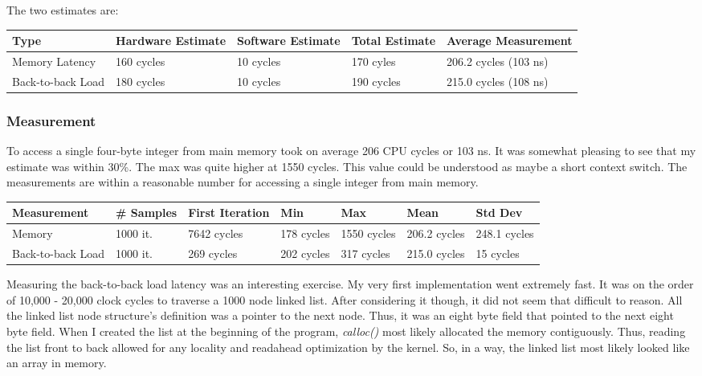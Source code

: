 \documentclass[paper=a4, fontsize=11pt]{scrartcl}
\numberwithin{equation}{section}        %
\numberwithin{figure}{section}          %
\numberwithin{table}{section}               %
\begin{document}
The two estimates are:

\begin{center}
    \begin{tabular}{ | l | l | l | l | l |}
    \hline
    Type & Hardware Estimate & Software Estimate & Total Estimate & Average Measurement \\      \hline
    Memory Latency & 160 cycles & 10 cycles & 170 cyles & 206.2 cycles (103 ns) \\ 
    Back-to-back Load & 180 cycles & 10 cycles & 190 cycles & 215.0 cycles (108 ns) \\
    \hline
    \end{tabular}
\end{center}


\subsubsection{Measurement}

To access a single four-byte integer from main memory took on average 206 CPU cycles or 103 ns.  It was somewhat pleasing to see that my estimate was within 30\%.  The max was quite higher at 1550 cycles.  This value could be understood as maybe a short context switch.  The measurements are within a reasonable number for accessing a single integer from main memory.


\begin{center}
    \begin{tabular}{ |l | l | l | l | l | l | l |}
    \hline
    Measurement & \# Samples & First Iteration & Min & Max & Mean & Std Dev \\ \hline
    Memory & 1000 it. & 7642 cycles & 178 cycles & 1550 cycles & 206.2 cycles & 248.1  cycles \\ 
    Back-to-back Load & 1000 it. & 269 cycles & 202 cycles & 317 cycles & 215.0 cycles & 15 cycles \\
    \hline
    \end{tabular}
\end{center}

Measuring the back-to-back load latency was an interesting exercise.  My very first implementation went extremely fast.  It was on the order of 10,000 - 20,000 clock cycles to traverse a 1000 node linked list.  After considering it though, it did not seem that difficult to reason.  All the linked list node structure's definition was a pointer to the next node.  Thus, it was an eight byte field that pointed to the next eight byte field.  When I created the list at the beginning of the program, \textit{calloc()} most likely allocated the memory contiguously.  Thus, reading the list front to back allowed for any locality and readahead optimization by the kernel.  So, in a way, the linked list most likely looked like an array in memory.
\end{document}
